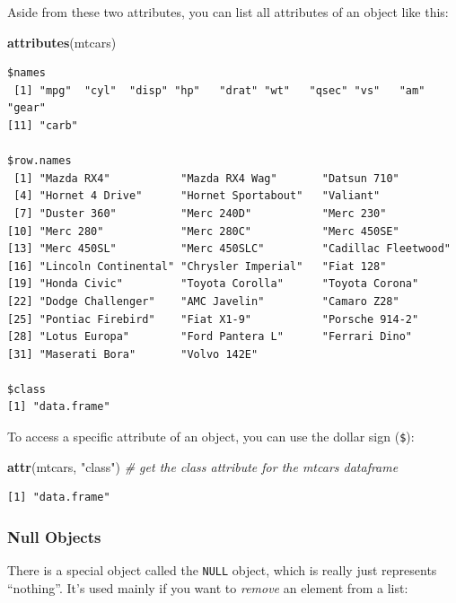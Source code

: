 \documentclass[
]{article}
\newenvironment{Shaded}{\begin{snugshade}}{\end{snugshade}}
\newcommand{\CommentTok}[1]{\textcolor[rgb]{0.56,0.35,0.01}{\textit{#1}}}
\newcommand{\KeywordTok}[1]{\textcolor[rgb]{0.13,0.29,0.53}{\textbf{#1}}}
\newcommand{\NormalTok}[1]{#1}
\newcommand{\StringTok}[1]{\textcolor[rgb]{0.31,0.60,0.02}{#1}}
\begin{document}
Aside from these two attributes, you can list all attributes of an object like this:

\begin{Shaded}
\begin{Highlighting}[]
\KeywordTok{attributes}\NormalTok{(mtcars)}
\end{Highlighting}
\end{Shaded}

\begin{verbatim}
$names
 [1] "mpg"  "cyl"  "disp" "hp"   "drat" "wt"   "qsec" "vs"   "am"   "gear"
[11] "carb"

$row.names
 [1] "Mazda RX4"           "Mazda RX4 Wag"       "Datsun 710"         
 [4] "Hornet 4 Drive"      "Hornet Sportabout"   "Valiant"            
 [7] "Duster 360"          "Merc 240D"           "Merc 230"           
[10] "Merc 280"            "Merc 280C"           "Merc 450SE"         
[13] "Merc 450SL"          "Merc 450SLC"         "Cadillac Fleetwood" 
[16] "Lincoln Continental" "Chrysler Imperial"   "Fiat 128"           
[19] "Honda Civic"         "Toyota Corolla"      "Toyota Corona"      
[22] "Dodge Challenger"    "AMC Javelin"         "Camaro Z28"         
[25] "Pontiac Firebird"    "Fiat X1-9"           "Porsche 914-2"      
[28] "Lotus Europa"        "Ford Pantera L"      "Ferrari Dino"       
[31] "Maserati Bora"       "Volvo 142E"         

$class
[1] "data.frame"
\end{verbatim}

To access a specific attribute of an object, you can use the dollar sign (\texttt{\$}):

\begin{Shaded}
\begin{Highlighting}[]
\KeywordTok{attr}\NormalTok{(mtcars, }\StringTok{"class"}\NormalTok{)  }\CommentTok{# get the class attribute for the mtcars dataframe}
\end{Highlighting}
\end{Shaded}

\begin{verbatim}
[1] "data.frame"
\end{verbatim}

\hypertarget{null-objects}{%
\subsubsection{Null Objects}\label{null-objects}}

There is a special object called the \texttt{NULL} object, which is really just represents ``nothing''.
It's used mainly if you want to \emph{remove} an element from a list:
\end{document}
